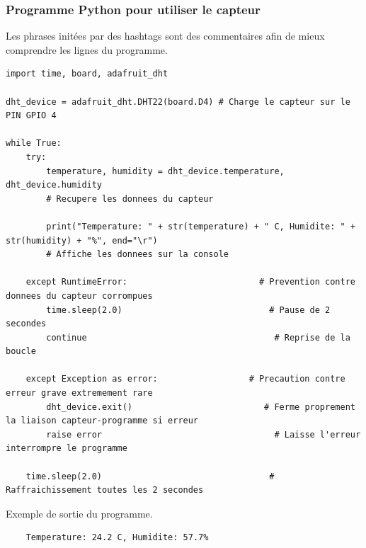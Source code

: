 \documentclass[a4paper]{article}
\begin{document}
\subsubsection{Programme Python pour utiliser le capteur}
Les phrases initées par des hashtags sont des commentaires afin de mieux comprendre les lignes du programme.
\begin{lstlisting}[language=iPython]
import time, board, adafruit_dht

dht_device = adafruit_dht.DHT22(board.D4) # Charge le capteur sur le PIN GPIO 4

while True:
    try:
        temperature, humidity = dht_device.temperature, dht_device.humidity 
        # Recupere les donnees du capteur
        
        print("Temperature: " + str(temperature) + " C, Humidite: " + str(humidity) + "%", end="\r") 
        # Affiche les donnees sur la console
        
    except RuntimeError:                          # Prevention contre donnees du capteur corrompues 
        time.sleep(2.0)                             # Pause de 2 secondes
        continue                                     # Reprise de la boucle
        
    except Exception as error:                  # Precaution contre erreur grave extremement rare
        dht_device.exit()                          # Ferme proprement la liaison capteur-programme si erreur
        raise error                                  # Laisse l'erreur interrompre le programme
        
    time.sleep(2.0)                                 # Raffraichissement toutes les 2 secondes 
\end{lstlisting}
Exemple de sortie du programme.
\begin{lstlisting}
    Temperature: 24.2 C, Humidite: 57.7%
\end{lstlisting}
\end{document}
